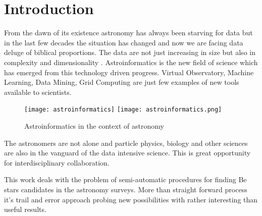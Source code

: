 \chapter*{Introduction}
\fancyhead{}
\fancyhead{}


\renewcommand{\LettrineFontHook}{\color{red}}


\lettrine[lines = 3, loversize=-0.1, lraise=0.1]{F}{}rom the dawn of
its existence astronomy has always been starving for data but in the
last few decades the situation has changed and now we are facing data
deluge of biblical proportions. The data are not just increasing in
size but also in complexity and dimensionality
\citep{ballastroinformatics}. Astroinformatics is the new field of
science which has emerged from this technology driven progress.
Virtual Observatory, Machine Learning, Data Mining, Grid Computing are
just few examples of new tools available to scientists.


\vspace{10pt}
\begin{figure}[!htbp]
  \begin{center}
    \leavevmode
    \ifpdf
    \texttt{[image: astroinformatics]}
    \else
    \texttt{[image: astroinformatics.png]}
    \fi
    \caption{Astroinformatics in the context of astronomy \cite{ballastroinformatics} }
    \label{FigAir}
  \end{center}
\end{figure}
\vspace{-10pt}



The astronomers are not alone and particle physics, biology and other
sciences are also in the vanguard of the data intensive science. This
is great opportunity for interdisciplinary collaboration.

This work deals with the problem of semi-automatic procedures for
finding Be stars \cite{porter2003classical} candidates in the
astronomy surveys. More than straight forward process it's trail and
error approach probing new possibilities with rather interesting than
useful results.


